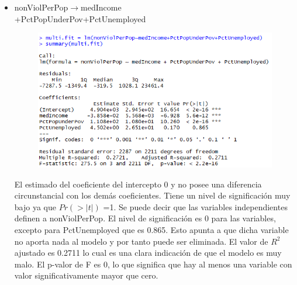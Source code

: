 \documentclass[a4paper,10pt,twocolumn]{article}
\begin{document}
\begin{itemize}
	\item {nonViolPerPop$\rightarrow$medIncome \\ +PctPopUnderPov+PctUnemployed}
			
			
			
			
			
		
		\begin{figure}[H]
			\begin{center}
				\includegraphics[width=.92\columnwidth,right]{figures/multifit5.png}
			\end{center}
		\end{figure}
	El estimado del coeficiente del intercepto 0 y no posee una diferencia circunstancial con los demás coeficientes. Tiene un nivel de significación muy bajo ya que $Pr(> | t | )$ =1.
	Se puede decir que las variables independientes definen a nonViolPerPop. El nivel de significación es 0 para las variables, excepto para PctUnemployed que es 0.865. Esto apunta a que dicha variable no aporta nada al modelo y por tanto puede ser eliminada. El valor de $R^2$ ajustado es 0.2711 lo cual es una clara indicación de que el modelo es muy malo. El p-valor de F es 0, lo que significa que hay al menos una variable con valor significativamente mayor que cero.


\end{itemize}
\end{document}
